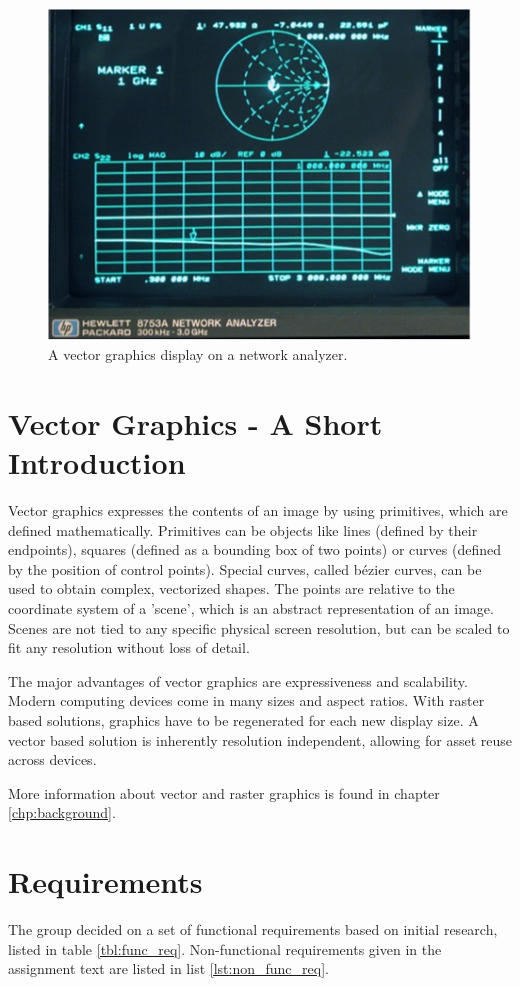 \begin{figure}[h!]
    \centering
    \includegraphics[width=0.6\linewidth]{images/network-analyzer-vector-graphics-display.png}
    \caption{A vector graphics display on a network analyzer\cite{assignment-text}.}
    \label{fig:vector-display-network-analyzer}
\end{figure}

\section{Vector Graphics - A Short Introduction}
Vector graphics expresses the contents of an image by using primitives, which are defined mathematically.
Primitives can be objects like lines (defined by their endpoints), squares (defined as a bounding box of two points) or curves (defined by the position of control points).
Special curves, called bézier curves, can be used to obtain complex, vectorized shapes.
The points are relative to the coordinate system of a 'scene', which is an abstract representation of an image.
Scenes are not tied to any specific physical screen resolution, but can be scaled to fit any resolution without loss of detail.

The major advantages of vector graphics are expressiveness and scalability.
Modern computing devices come in many sizes and aspect ratios.
With raster based solutions, graphics have to be regenerated for each new display size.
A vector based solution is inherently resolution independent, allowing for asset reuse across devices.

More information about vector and raster graphics is found in chapter \ref{chp:background}.

\section{Requirements}
\label{sec:requirements}
The group decided on a set of functional requirements based on initial research, listed in table \ref{tbl:func_req}.
Non-functional requirements given in the assignment text are listed in list \ref{lst:non_func_req}.

